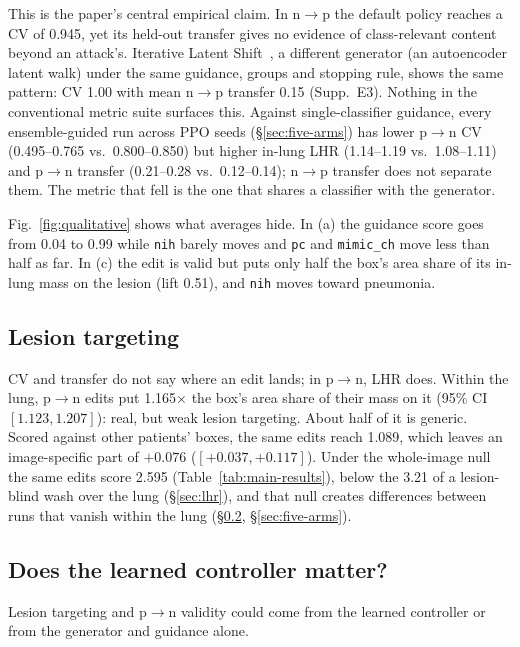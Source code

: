 This is the paper's central empirical claim. In n$\to$p the default policy reaches a CV of 0.945, yet its held-out transfer gives no evidence of class-relevant content beyond an attack's. Iterative Latent Shift~\cite{cohen2021gifsplanation}, a different generator (an autoencoder latent walk) under the same guidance, groups and stopping rule, shows the same pattern: CV 1.00 with mean n$\to$p transfer 0.15 (Supp.~E3). Nothing in the conventional metric suite surfaces this. Against single-classifier guidance, every ensemble-guided run across PPO seeds (\S\ref{sec:five-arms}) has lower p$\to$n CV (0.495--0.765 vs.\ 0.800--0.850) but higher in-lung LHR (1.14--1.19 vs.\ 1.08--1.11) and p$\to$n transfer (0.21--0.28 vs.\ 0.12--0.14); n$\to$p transfer does not separate them. The metric that fell is the one that shares a classifier with the generator.

Fig.~\ref{fig:qualitative} shows what averages hide. In (a) the guidance score goes from 0.04 to 0.99 while \texttt{nih} barely moves and \texttt{pc} and \texttt{mimic\_ch} move less than half as far. In (c) the edit is valid but puts only half the box's area share of its in-lung mass on the lesion (lift 0.51), and \texttt{nih} moves toward pneumonia.

\subsection{Lesion targeting}
\label{sec:lesion-targeting}

CV and transfer do not say where an edit lands; in p$\to$n, LHR does. Within the lung, p$\to$n edits put 1.165$\times$ the box's area share of their mass on it (95\% CI $[1.123, 1.207]$): real, but weak lesion targeting. About half of it is generic. Scored against other patients' boxes, the same edits reach 1.089, which leaves an image-specific part of $+0.076$ ($[+0.037, +0.117]$). Under the whole-image null the same edits score 2.595 (Table~\ref{tab:main-results}), below the 3.21 of a lesion-blind wash over the lung (\S\ref{sec:lhr}), and that null creates differences between runs that vanish within the lung (\S\ref{sec:controller}, \S\ref{sec:five-arms}).

\subsection{Does the learned controller matter?}
\label{sec:controller}

Lesion targeting and p$\to$n validity could come from the learned controller or from the generator and guidance alone.

